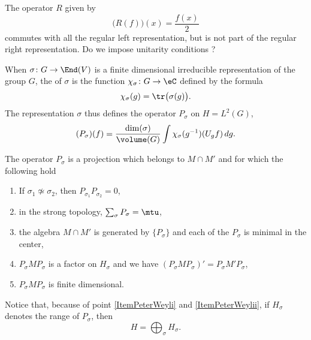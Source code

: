 \begin{probleme}
	The operator $R$ given by 
	\begin{equation}
		\big(R(f)\big)(x)=\frac{ f(x) }{ 2 }
	\end{equation}
	commutes with all the regular left representation, but is not part of the regular right representation. Do we impose unitarity conditions ?
\end{probleme}

When $\sigma\colon G\to \End(V)$ is a finite dimensional irreducible representation of the group $G$, the  of $\sigma$ is the function $\chi_{\sigma}\colon G\to \eC$ defined by the formula
\begin{equation}
	\chi_{\sigma}(g)=\tr\big( \sigma(g) \big).
\end{equation}
The representation $\sigma$ thus defines the operator $P_{\sigma}$ on $H=L^2(G)$,
\begin{equation}
	(P_{\sigma})(f)=\frac{ \dim(\sigma) }{ \volume(G) }\int \chi_{\sigma}(g^{-1})(U_gf)\,dg.
\end{equation}

\begin{theorem}			\label{ThoPeterWeyl}
	The operator $P_{\sigma}$ is a projection which belongs to $M\cap M'$ and for which the following hold
	\begin{enumerate}
		\item\label{ItemPeterWeyli} If $\sigma_1\nsimeq \sigma_2$, then $P_{\sigma_1}P_{\sigma_2}=0$,
		\item \label{ItemPeterWeylii} in the strong topology, $\sum_{\sigma}P_{\sigma}=\mtu$,
		\item the algebra $M\cap M'$ is generated by $\{ P_{\sigma} \}$ and each of the $P_{\sigma}$ is minimal in the center,
		\item $P_{\sigma}MP_{\sigma}$ is a factor on $H_{\sigma}$ and we have $(P_{\sigma}MP_{\sigma})'=P_{\sigma}M'P_{\sigma}$,
		\item $P_{\sigma}MP_{\sigma}$ is finite dimensional.
	\end{enumerate}
\end{theorem}

Notice that, because of point \ref{ItemPeterWeyli} and \ref{ItemPeterWeylii}, if $H_{\sigma}$ denotes the range of $P_{\sigma}$, then
\begin{equation}
	H=\bigoplus_{\sigma}H_{\sigma}.
\end{equation}

